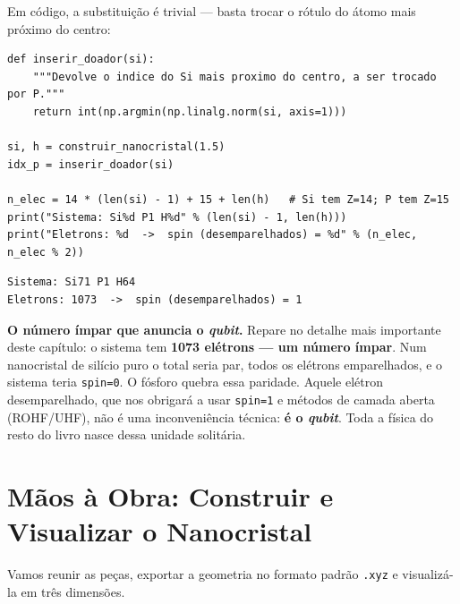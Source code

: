 \documentclass[11pt,a4paper,openany]{book}
\newcommand{\code}[1]{\texttt{#1}}
\newcommand{\qubit}{\emph{qubit}}
\begin{document}
Em código, a substituição é trivial --- basta trocar o rótulo do átomo mais
próximo do centro:

\begin{lstlisting}[style=python,caption={Inserindo o doador de fósforo.},label={lst:doador}]
def inserir_doador(si):
    """Devolve o indice do Si mais proximo do centro, a ser trocado por P."""
    return int(np.argmin(np.linalg.norm(si, axis=1)))

si, h = construir_nanocristal(1.5)
idx_p = inserir_doador(si)

n_elec = 14 * (len(si) - 1) + 15 + len(h)   # Si tem Z=14; P tem Z=15
print("Sistema: Si%d P1 H%d" % (len(si) - 1, len(h)))
print("Eletrons: %d  ->  spin (desemparelhados) = %d" % (n_elec, n_elec % 2))
\end{lstlisting}

\begin{lstlisting}[style=console]
Sistema: Si71 P1 H64
Eletrons: 1073  ->  spin (desemparelhados) = 1
\end{lstlisting}

\begin{caixanota}
\textbf{O número ímpar que anuncia o \qubit{}.} Repare no detalhe mais importante
deste capítulo: o sistema tem \textbf{1073 elétrons --- um número ímpar}. Num
nanocristal de silício puro o total seria par, todos os elétrons emparelhados, e o
sistema teria \code{spin=0}. O fósforo quebra essa paridade. Aquele elétron
desemparelhado, que nos obrigará a usar \code{spin=1} e métodos de camada aberta
(ROHF/UHF), não é uma inconveniência técnica: \textbf{é o \qubit{}}. Toda a física
do resto do livro nasce dessa unidade solitária.
\end{caixanota}

\section{Mãos à Obra: Construir e Visualizar o Nanocristal}
\label{sec:maos3}

Vamos reunir as peças, exportar a geometria no formato padrão \code{.xyz} e
visualizá-la em três dimensões.
\end{document}
